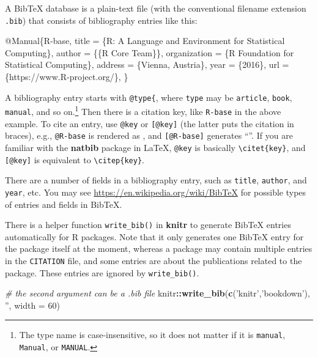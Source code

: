 \documentclass[]{article}
\newenvironment{Shaded}{\begin{snugshade}}{\end{snugshade}}
\newcommand{\CommentTok}[1]{\textcolor[rgb]{0.56,0.35,0.01}{\textit{#1}}}
\newcommand{\DataTypeTok}[1]{\textcolor[rgb]{0.13,0.29,0.53}{#1}}
\newcommand{\DecValTok}[1]{\textcolor[rgb]{0.00,0.00,0.81}{#1}}
\newcommand{\KeywordTok}[1]{\textcolor[rgb]{0.13,0.29,0.53}{\textbf{#1}}}
\newcommand{\NormalTok}[1]{#1}
\newcommand{\OperatorTok}[1]{\textcolor[rgb]{0.81,0.36,0.00}{\textbf{#1}}}
\newcommand{\OtherTok}[1]{\textcolor[rgb]{0.56,0.35,0.01}{#1}}
\newcommand{\StringTok}[1]{\textcolor[rgb]{0.31,0.60,0.02}{#1}}
\newcommand{\VariableTok}[1]{\textcolor[rgb]{0.00,0.00,0.00}{#1}}
\begin{document}
A BibTeX database is a plain-text file (with the conventional filename
extension \texttt{.bib}) that consists of bibliography entries like
this:

\begin{Shaded}
\begin{Highlighting}[]
\VariableTok{@Manual}\NormalTok{\{}\OtherTok{R}\NormalTok{-}\OtherTok{base}\NormalTok{,}
  \DataTypeTok{title}\NormalTok{ = \{R: A Language and Environment for Statistical}
\NormalTok{    Computing\},}
  \DataTypeTok{author}\NormalTok{ = \{\{R Core Team\}\},}
  \DataTypeTok{organization}\NormalTok{ = \{R Foundation for Statistical Computing\},}
  \DataTypeTok{address}\NormalTok{ = \{Vienna, Austria\},}
  \DataTypeTok{year}\NormalTok{ = \{2016\},}
  \DataTypeTok{url}\NormalTok{ = \{https://www.R-project.org/\},}
\NormalTok{\}}
\end{Highlighting}
\end{Shaded}

A bibliography entry starts with \texttt{@type\{}, where \texttt{type}
may be \texttt{article}, \texttt{book}, \texttt{manual}, and so
on.\footnote{The type name is case-insensitive, so it does not matter if
  it is \texttt{manual}, \texttt{Manual}, or \texttt{MANUAL}.} Then
there is a citation key, like \texttt{R-base} in the above example. To
cite an entry, use \texttt{@key} or \texttt{{[}@key{]}} (the latter puts
the citation in braces), e.g., \texttt{@R-base} is rendered as
\citet{R-base}, and \texttt{{[}@R-base{]}} generates ``\citep{R-base}''.
If you are familiar with the \textbf{natbib} package in LaTeX,
\texttt{@key} is basically \texttt{\textbackslash{}citet\{key\}}, and
\texttt{{[}@key{]}} is equivalent to
\texttt{\textbackslash{}citep\{key\}}.

There are a number of fields in a bibliography entry, such as
\texttt{title}, \texttt{author}, and \texttt{year}, etc. You may see
\url{https://en.wikipedia.org/wiki/BibTeX} for possible types of entries
and fields in BibTeX.

There is a helper function \texttt{write\_bib()} in \textbf{knitr} to
generate BibTeX entries automatically for R packages. Note that it only
generates one BibTeX entry for the package itself at the moment, whereas
a package may contain multiple entries in the \texttt{CITATION} file,
and some entries are about the publications related to the package.
These entries are ignored by \texttt{write\_bib()}.

\begin{Shaded}
\begin{Highlighting}[]
\CommentTok{# the second argument can be a .bib file}
\NormalTok{knitr}\OperatorTok{::}\KeywordTok{write_bib}\NormalTok{(}\KeywordTok{c}\NormalTok{(}\StringTok{'knitr'}\NormalTok{,}\StringTok{'bookdown'}\NormalTok{), }\StringTok{''}\NormalTok{, }\DataTypeTok{width =} \DecValTok{60}\NormalTok{)}
\end{Highlighting}
\end{Shaded}
\end{document}
